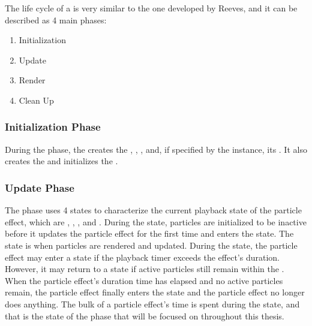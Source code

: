 The life cycle of a  is very similar to the one developed by Reeves, and it can be described as 4 main phases:

\begin{enumerate}[nolistsep,topsep=10pt]

	\item Initialization
	\item Update
	\item Render
	\item Clean Up

\end{enumerate} 

\subsubsection{Initialization Phase}

During the  phase, the  creates the , , , and, if specified by the  instance, its . It also creates the  and initializes the . 

\subsubsection{Update Phase}

The  phase uses 4 states to characterize the current playback state of the particle effect, which are , , , and . During the  state, particles are initialized to be inactive before it updates the particle effect for the first time and enters the  state. The  state is when particles are rendered and updated. During the  state, the particle effect may enter a  state if the playback timer exceeds the effect's duration. However, it may return to a  state if active particles still remain within the . When the particle effect's duration time has elapsed and no active particles remain, the particle effect finally enters the  state and the particle effect no longer does anything. The bulk of a particle effect's time is spent during the  state, and that is the state of the  phase that will be focused on throughout this thesis.

